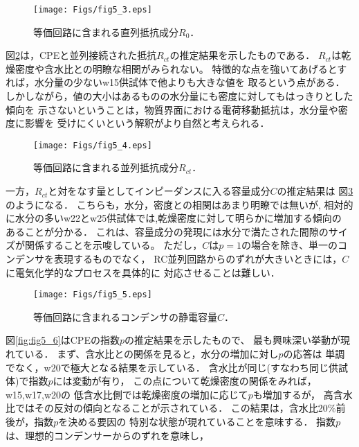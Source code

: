 \begin{figure}[h]
	\begin{center}
	\texttt{[image: Figs/fig5\_3.eps]} 
	\end{center}
	\caption{
		等価回路に含まれる直列抵抗成分$R_0$．
	} 
	\label{fig:fig5_3}
\end{figure}
図\ref{fig:fig5_4}は，CPEと並列接続された抵抗$R_{ct}$の推定結果を示したものである．
$R_{ct}$は乾燥密度や含水比との明瞭な相関がみられない。
特徴的な点を強いてあげるとすれば，水分量の少ないw15供試体で他よりも大きな値を
取るという点がある．
しかしながら，値の大小はあるものの水分量にも密度に対してもはっきりとした傾向を
示さないということは，物質界面における電荷移動抵抗は，水分量や密度に影響を
受けにくいという解釈がより自然と考えられる．
\begin{figure}[h]
	\begin{center}
	\texttt{[image: Figs/fig5\_4.eps]} 
	\end{center}
	\caption{
		等価回路に含まれる並列抵抗成分$R_{ct}$．
	} 
	\label{fig:fig5_4}
\end{figure}
一方，$R_{ct}$と対をなす量としてインピーダンスに入る容量成分$C$の推定結果は
図\ref{fig:fig5_5}のようになる．
こちらも，水分，密度との相関はあまり明瞭では無いが,
相対的に水分の多いw22とw25供試体では,乾燥密度に対して明らかに増加する傾向の
あることが分かる．
これは、容量成分の発現には水分で満たされた間隙のサイズが関係することを示唆している。
ただし，$C$は$p=1$の場合を除き、単一のコンデンサを表現するものでなく，
RC並列回路からのずれが大きいときには，$C$に電気化学的なプロセスを具体的に
対応させることは難しい．
\begin{figure}[h]
	\begin{center}
	\texttt{[image: Figs/fig5\_5.eps]} 
	\end{center}
	\caption{
		等価回路に含まれるコンデンサの静電容量$C$．
	} 
	\label{fig:fig5_5}
\end{figure}
図\ref{fig:fig5_6}はCPEの指数$p$の推定結果を示したもので、
最も興味深い挙動が現れている．
まず、含水比との関係を見ると，水分の増加に対し$p$の応答は
単調でなく，w20で極大となる結果を示している．
含水比が同じ(すなわち同じ供試体)で指数$p$には変動が有り，
この点について乾燥密度の関係をみれば，w15,w17,w20の
低含水比側では乾燥密度の増加に応じて$p$も増加するが，
高含水比ではその反対の傾向となることが示されている．
この結果は，含水比20\%前後が，指数$p$を決める要因の
特別な状態が現れていることを意味する．
指数$p$は、理想的コンデンサーからのずれを意味し，
